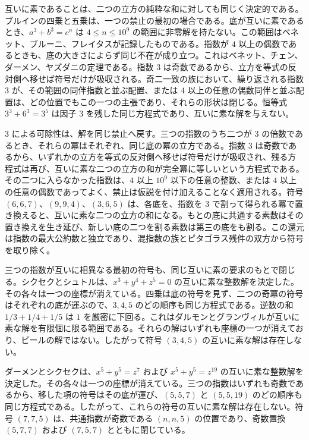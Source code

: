 \documentclass[a4paper]{article}
\theoremstyle{definition}
\theoremstyle{remark}
\begin{document}
互いに素であることは、二つの立方の純粋な和に対しても同じく決定的である。ブルインの四乗と五乗は、一つの禁止の最初の場合である。底が互いに素であるとき、\( a^3+b^3=c^n \) は \( 4\le n\le 10^9 \) の範囲に非零解を持たない。この範囲はベネット、ブルーニ、フレイタスが記録したものである。指数が \( 4 \) 以上の偶数であるときも、底の大きさによらず同じ不在が成り立つ。これはベネット、チェン、ダーメン、ヤズダニの定理である。指数 \( 3 \) は奇数であるから、立方を等式の反対側へ移せば符号だけが吸収される。奇二一致の族において、繰り返される指数 \( 3 \) が、その範囲の同伴指数と並ぶ配置、または \( 4 \) 以上の任意の偶数同伴と並ぶ配置は、どの位置でもこの一つの主張であり、それらの形状は閉じる。恒等式 \( 3^3+6^3=3^5 \) は因子 \( 3 \) を残した同じ方程式であり、互いに素な解を与えない。

3 による可除性は、解を同じ禁止へ戻す。三つの指数のうち二つが 3 の倍数であるとき、それらの冪はそれぞれ、同じ底の冪の立方である。指数 3 は奇数であるから、いずれかの立方を等式の反対側へ移せば符号だけが吸収され、残る方程式は再び、互いに素な二つの立方の和が完全冪に等しいという方程式である。その二つに入らなかった指数は、\( 4 \) 以上 \( 10^9 \) 以下の任意の整数、または \( 4 \) 以上の任意の偶数であってよく、禁止は仮説を付け加えることなく適用される。符号 \( (6,6,7) \)、\( (9,9,4) \)、\( (3,6,5) \) は、各底を、指数を 3 で割って得られる冪で置き換えると、互いに素な二つの立方の和になる。もとの底に共通する素数はその置き換えを生き延び、新しい底の二つを割る素数は第三の底をも割る。この還元は指数の最大公約数と独立であり、混指数の族とピタゴラス残件の双方から符号を取り除く。

三つの指数が互いに相異なる最初の符号も、同じ互いに素の要求のもとで閉じる。シクセクとシュトルは、\( x^3+y^4+z^5=0 \) の互いに素な整数解を決定した。その各々は一つの座標が消えている。四乗は底の符号を見ず、二つの奇冪の符号はそれぞれの底が運ぶので、\( 3,4,5 \) のどの順序も同じ方程式である。逆数の和 \( 1/3+1/4+1/5 \) は \( 1 \) を厳密に下回る。これはダルモンとグランヴィルが互いに素な解を有限個に限る範囲である。それらの解はいずれも座標の一つが消えており、ビールの解ではない。したがって符号 \( (3,4,5) \) の互いに素な解は存在しない。

ダーメンとシクセクは、\( x^5+y^5=z^7 \) および \( x^5+y^5=z^{19} \) の互いに素な整数解を決定した。その各々は一つの座標が消えている。三つの指数はいずれも奇数であるから、移した項の符号はその底が運び、\( (5,5,7) \) と \( (5,5,19) \) のどの順序も同じ方程式である。したがって、これらの符号の互いに素な解は存在しない。符号 \( (7,7,5) \) は、共通指数が奇数である \( (n,n,5) \) の位置であり、奇数置換 \( (5,7,7) \) および \( (7,5,7) \) とともに閉じている。
\end{document}
